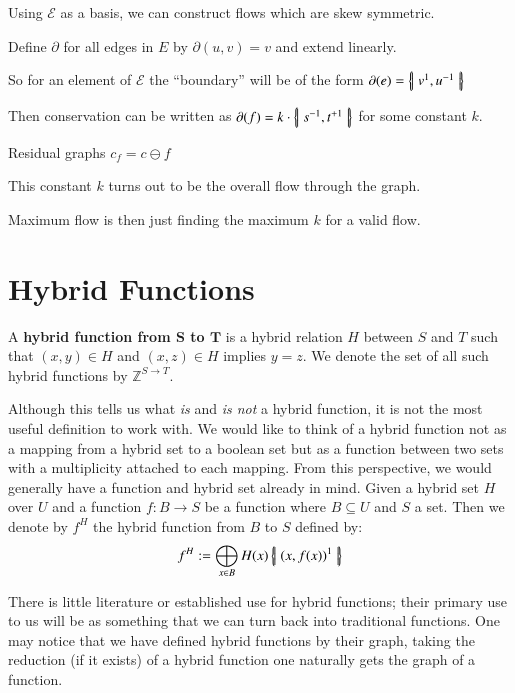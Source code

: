 Using $\mathcal{E}$ as a basis, we can construct flows which are skew symmetric.

Define $\partial$ for all edges in $E$ by $\partial(u,v) = v$ and extend linearly.

So for an element of $\mathcal{E}$ the ``boundary'' will be of the form $\partial(e) = \left\{ \! \left| \; v^1, u^{-1} \; \right| \! \right\}$

Then conservation can be written as $\partial(f) = k \cdot \left\{ \! \left| \; s^{-1}, t^{+1} \; \right| \! \right\}$ for some constant $k$.

Residual graphs $c_f = c \ominus f$ 

This constant $k$ turns out to be the overall flow through the graph.

Maximum flow is then just finding the maximum $k$ for a valid flow.


\newpage


\section{Hybrid Functions}\label{sec:HybridFunction}
\begin{definition}
	A \textbf{hybrid function from $\boldsymbol{S}$ to $\boldsymbol{T}$} is 
	a hybrid relation $H$ between $S$ and $T$ such that $(x,y) \in H$ and $(x,z) \in H$ implies $y=z$.
	We denote the set of all such hybrid functions by $\mathbb{Z}^{S \to T}$.
\end{definition}


Although this tells us what \emph{is} and \emph{is not} a hybrid function, it is not the most useful definition to work with. 
We would like to think of a hybrid function not as a mapping from a hybrid set to a boolean set but as
a function between two sets with a multiplicity attached to each mapping.
From this perspective, we would generally have a function and hybrid set already in mind.
Given a hybrid set $H$ over $U$ and a function $f:B \to S$ be a function where $B \subseteq U$ and $S$ a set.
Then we denote by $f^H$ the hybrid function from $B$ to $S$ defined by:
\begin{equation}
	\label{hfunc}
	f^H := \bigoplus_{x \in B} H(x) \left\{ \! \left| \;  (x, f(x) )^1  \; \right| \! \right\}
\end{equation}


There is little literature or established use for hybrid functions;
their primary use to us will be as something that we can turn back into traditional functions.
One may notice that we have defined hybrid functions by their graph,
taking the reduction (if it exists) of a hybrid function one naturally gets the graph of a function.


